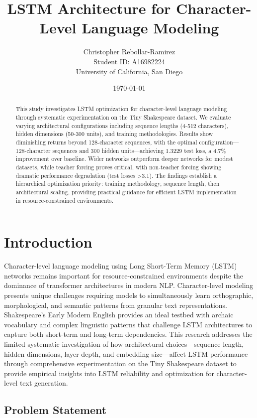 \documentclass[12pt]{article}
\title{LSTM Architecture for Character-Level Language Modeling}
\author{Christopher Rebollar-Ramirez\\Student ID: A16982224\\University of California, San Diego}
\date{\today}
\begin{document}
\maketitle

\begin{abstract}
This study investigates LSTM optimization for character-level language modeling through systematic experimentation on the Tiny Shakespeare dataset. We evaluate varying architectural configurations including sequence lengths (4-512 characters), hidden dimensions (50-300 units), and training methodologies. Results show diminishing returns beyond 128-character sequences, with the optimal configuration—128-character sequences and 300 hidden units—achieving 1.3229 test loss, a 4.7\% improvement over baseline. Wider networks outperform deeper networks for modest datasets, while teacher forcing proves critical, with non-teacher forcing showing dramatic performance degradation (test losses >3.1). The findings establish a hierarchical optimization priority: training methodology, sequence length, then architectural scaling, providing practical guidance for efficient LSTM implementation in resource-constrained environments.
\end{abstract}

\section{Introduction}
\label{sec:introduction}

Character-level language modeling using Long Short-Term Memory (LSTM) networks remains important for resource-constrained environments despite the dominance of transformer architectures in modern NLP. Character-level modeling presents unique challenges requiring models to simultaneously learn orthographic, morphological, and semantic patterns from granular text representations. Shakespeare's Early Modern English provides an ideal testbed with archaic vocabulary and complex linguistic patterns that challenge LSTM architectures to capture both short-term and long-term dependencies. This research addresses the limited systematic investigation of how architectural choices—sequence length, hidden dimensions, layer depth, and embedding size—affect LSTM performance through comprehensive experimentation on the Tiny Shakespeare dataset to provide empirical insights into LSTM reliability and optimization for character-level text generation.

\subsection{Problem Statement}
\end{document}
